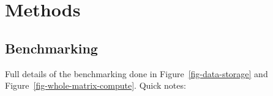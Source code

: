 \documentclass[a4paper,num-refs]{oup-contemporary}
\begin{document}




\section{Methods}

\subsection{Benchmarking}
Full details of the benchmarking done in
Figure~\ref{fig-data-storage} and
Figure~\ref{fig-whole-matrix-compute}.
Quick notes:
\end{document}

